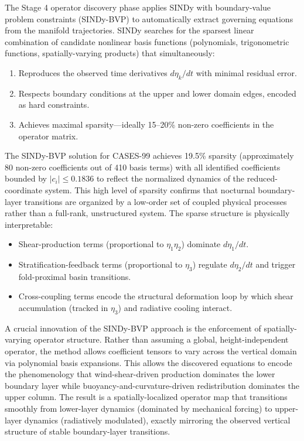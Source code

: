 \documentclass[12pt,a4paper]{article}
\begin{document}
The Stage 4 operator discovery phase applies SINDy with boundary-value problem constraints (SINDy-BVP) to automatically extract governing equations from the manifold trajectories. SINDy searches for the sparsest linear combination of candidate nonlinear basis functions (polynomials, trigonometric functions, spatially-varying products) that simultaneously:
\begin{enumerate}
  \item Reproduces the observed time derivatives $d\eta_k/dt$ with minimal residual error.
  \item Respects boundary conditions at the upper and lower domain edges, encoded as hard constraints.
  \item Achieves maximal sparsity---ideally 15--20\% non-zero coefficients in the operator matrix.
\end{enumerate}

The SINDy-BVP solution for CASES-99 achieves 19.5\% sparsity (approximately 80 non-zero coefficients out of 410 basis terms) with all identified coefficients bounded by $|c_i| \leq 0.1836$ to reflect the normalized dynamics of the reduced-coordinate system. This high level of sparsity confirms that nocturnal boundary-layer transitions are organized by a low-order set of coupled physical processes rather than a full-rank, unstructured system. The sparse structure is physically interpretable:
\begin{itemize}
  \item Shear-production terms (proportional to $\eta_1 \eta_2$) dominate $d\eta_1/dt$.
  \item Stratification-feedback terms (proportional to $\eta_3$) regulate $d\eta_2/dt$ and trigger fold-proximal basin transitions.
  \item Cross-coupling terms encode the structural deformation loop by which shear accumulation (tracked in $\eta_3$) and radiative cooling interact.
\end{itemize}

A crucial innovation of the SINDy-BVP approach is the enforcement of spatially-varying operator structure. Rather than assuming a global, height-independent operator, the method allows coefficient tensors to vary across the vertical domain via polynomial basis expansions. This allows the discovered equations to encode the phenomenology that wind-shear-driven production dominates the lower boundary layer while buoyancy-and-curvature-driven redistribution dominates the upper column. The result is a spatially-localized operator map that transitions smoothly from lower-layer dynamics (dominated by mechanical forcing) to upper-layer dynamics (radiatively modulated), exactly mirroring the observed vertical structure of stable boundary-layer transitions.
\end{document}
